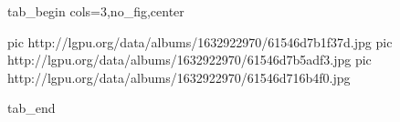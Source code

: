  
 
 
 
 


\ifcmt
  tab_begin cols=3,no_fig,center

     pic http://lgpu.org/data/albums/1632922970/61546d7b1f37d.jpg
		 pic http://lgpu.org/data/albums/1632922970/61546d7b5adf3.jpg
		 pic http://lgpu.org/data/albums/1632922970/61546d716b4f0.jpg

  tab_end
\fi

